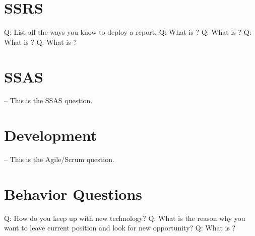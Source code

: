 \documentclass[a4paper,11pt]{article}
\begin{document}
\section{SSRS}
Q: List all the ways you know to deploy a report.\newline \newline
\noindent 
Q: What is ? \newline \newline
\noindent 
Q: What is ? \newline \newline
\noindent 
Q: What is ? \newline \newline
\noindent 
Q: What is ? \newline \newline

\section{SSAS}
-- This is the SSAS question.

\section{Development}
-- This is the Agile/Scrum question.

\section{Behavior Questions}
Q: How do you keep up with new technology? \newline \newline
\noindent 
Q: What is the reason why you want to leave current position and look for new opportunity? \newline \newline
\noindent 
Q: What is ? \newline \newline
\end{document}
